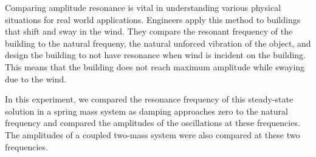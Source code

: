\par Comparing amplitude resonance is vital in understanding various physical situations for real world applications. Engineers apply this method to buildings that shift and sway in the wind. They compare the resonant frequency of the building to the natural frequeny, the natural unforced vibration of the object, and design the building to not have resonance when wind is incident on the building. This means that the building does not reach maximum amplitude while swaying due to the wind.

\par In this experiment, we compared the resonance frequency of this steady-state solution in a spring mass system as damping approaches zero to the natural frequency and compared the amplitudes of the oscillations at these frequencies. The amplitudes of a coupled two-mass system were also compared at these two frequencies.